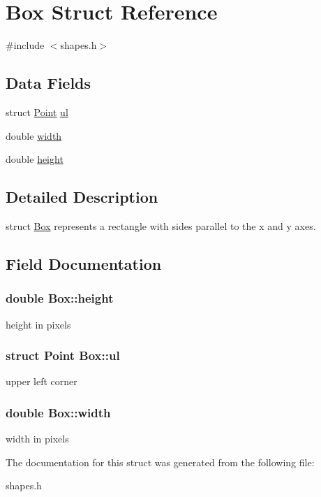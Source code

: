 \hypertarget{structBox}{
\section{Box Struct Reference}
\label{structBox}
}


{\ttfamily \#include $<$shapes.h$>$}\subsection*{Data Fields}
\begin{DoxyCompactItemize}
\item 
struct \hyperlink{structPoint}{Point} \hyperlink{structBox_adf85c8e45d4ac98233aa06d3a99294f4}{ul}
\item 
double \hyperlink{structBox_ac5070a1f665a8366ec9fcef3756928fa}{width}
\item 
double \hyperlink{structBox_ad55b7ad3149df711e6bab0effef74e27}{height}
\end{DoxyCompactItemize}


\subsection{Detailed Description}
struct \hyperlink{structBox}{Box} represents a rectangle with sides parallel to the x and y axes. 

\subsection{Field Documentation}
\hypertarget{structBox_ad55b7ad3149df711e6bab0effef74e27}{
\subsubsection[{height}]{\setlength{\rightskip}{0pt plus 5cm}double {\bf Box::height}}}
\label{structBox_ad55b7ad3149df711e6bab0effef74e27}
height in pixels \hypertarget{structBox_adf85c8e45d4ac98233aa06d3a99294f4}{
\subsubsection[{ul}]{\setlength{\rightskip}{0pt plus 5cm}struct {\bf Point} {\bf Box::ul}}}
\label{structBox_adf85c8e45d4ac98233aa06d3a99294f4}
upper left corner \hypertarget{structBox_ac5070a1f665a8366ec9fcef3756928fa}{
\subsubsection[{width}]{\setlength{\rightskip}{0pt plus 5cm}double {\bf Box::width}}}
\label{structBox_ac5070a1f665a8366ec9fcef3756928fa}
width in pixels 

The documentation for this struct was generated from the following file:\begin{DoxyCompactItemize}
\item 
shapes.h\end{DoxyCompactItemize}
